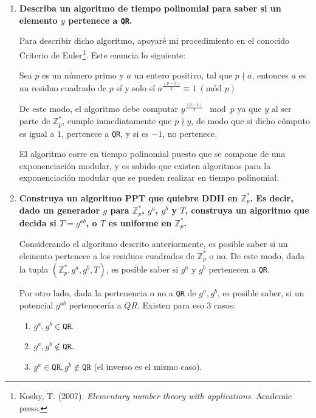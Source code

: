 \documentclass[twoside]{tareas}
\begin{document}
\begin{enumerate}
    \item \textbf{Describa un algoritmo de tiempo polinomial para saber si un elemento {\boldmath$y$} pertenece a \texttt{QR}.}

    Para describir dicho algoritmo, apoyaré mi procedimiento en el conocido Criterio de Euler\footnote{Koshy, T. (2007). \textit{Elementary number theory with applications}. Academic press.}. Este enuncia lo siguiente:

    Sea $p$ es un número primo y $a$ un entero positivo, tal que $p \nmid a$, entonces $a$ es un residuo cuadrado de $p$ sí y solo sí $a^{\frac{(p-1)}{2}} \equiv 1 \ ( \text{mód } p)$

    De este modo, el algoritmo debe computar $y^{\frac{(p-1)}{2}} \mod p$ ya que $y$ al ser parte de $\mathbb{Z}_p^*$, cumple inmediatamente que $p \nmid y$, de modo que si dicho cómputo es igual a $1$, pertenece a \texttt{QR}, y si es $-1$, no pertenece.

    El algoritmo corre en tiempo polinomial puesto que se compone de una exponenciación modular, y es sabido que existen algoritmos para la exponenciación modular que se pueden realizar en tiempo polinomial.

    \item \textbf{Construya un algoritmo PPT que quiebre DDH en {\boldmath$\mathbb{Z}_p^*$}. Es decir, dado un generador {\boldmath$g$} para {\boldmath$\mathbb{Z}_p^*$}, {\boldmath$g^a$}, {\boldmath$g^b$} y {\boldmath$T$}, construya un algoritmo que decida si {\boldmath$T = g^{ab}$}, o {\boldmath$T$} es uniforme en {\boldmath$\mathbb{Z}_p^*$}.}

    Considerando el algoritmo descrito anteriormente, es posible saber si un elemento pertenece a los residuos cuadrados de $\mathbb{Z}_p^*$ o no. De este modo, dada la tupla $(\mathbb{Z}_p^*, g^a, g^b, T)$, es posible saber si $g^a$ y $g^b$ pertenecen a \texttt{QR}.

    Por otro lado, dada la pertenencia o no a \texttt{QR} de $g^a, g^b$, es posible saber, si un potencial $g^{ab}$ pertenecería a $QR$. Existen para eso 3 casos:
    \begin{enumerate}
        \item $g^a, g^b \in \texttt{QR}$.
        \item $g^a, g^b \notin \texttt{QR}$.
        \item $g^a \in \texttt{QR}, g^b \notin \texttt{QR}$ (el inverso es el mismo caso).
    \end{enumerate}


\end{enumerate}
\end{document}
